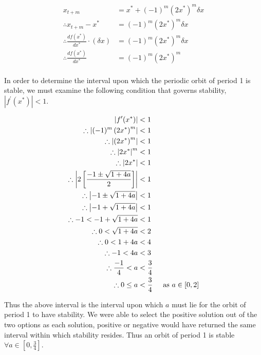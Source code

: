 \documentclass[a4paper]{article}
\begin{document}
\begin{enumerate}[label=\textbf{\arabic*.}]
\begin{enumerate}
		\begin{align*}
		x_{t+m} & = x^* + (-1)^m \left(2x^* \right)^m \delta x\\
		\therefore x_{t+m} - x^* & = (-1)^m \left(2x^* \right)^m \delta x\\
		\therefore \frac{df(x^*)}{dx^*} \cdot \left(\delta x \right) & = (-1)^m \left(2x^* \right)^m \delta x\\
		\therefore \frac{df(x^*)}{dx^*} & = (-1)^m \left(2x^* \right)^m\\
		\end{align*}

		In order to determine the interval upon which the periodic orbit of period 1 is stable, we must examine the following condition that governs stability, $\displaystyle{\left|f^{\prime}(x^*) \right| < 1}$.

		\begin{align*}
		\left|f^{\prime}(x^*) \right| & < 1\\
		\therefore \left|(-1)^m \left(2x^* \right)^m \right| & < 1\\
		\therefore \left|\left(2x^* \right)^m \right| & < 1\\
		\therefore \left|2x^* \right|^m & < 1\\
		\therefore \left|2x^* \right| & < 1\\
		\therefore \left|2\left[\frac{-1 \pm \sqrt{1+4a}}{2} \right] \right| & < 1\\
		\therefore \left|-1 \pm \sqrt{1+4a} \right| & < 1\\
		\therefore \left|-1 + \sqrt{1+4a} \right| & < 1\\
		\therefore -1 < -1 + \sqrt{1+4a} & < 1\\
		\therefore 0 < \sqrt{1+4a} & < 2\\
		\therefore 0 < 1 + 4a & < 4\\
		\therefore -1 < 4a & < 3\\
		\therefore \frac{-1}{4} < a & < \frac{3}{4}\\
		\therefore 0 \leq a & < \frac{3}{4} \hspace{5mm} \text{as } a \in [0,2]\\
		\end{align*}

		Thus the above interval is the interval upon which $a$ must lie for the orbit of period 1 to have stability. We were able to select the positive solution out of the two options as each solution, positive or negative would have returned the same interval within which stability resides. Thus an orbit of period 1 is stable $\displaystyle{\forall a \in \left[0,\frac{3}{4}\right]}$.


\end{enumerate}
\end{enumerate}
\end{document}
